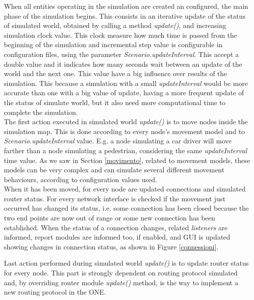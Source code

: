 When all entities operating in the simulation are created an configured, the main phase of the simulation begins. This consists in an iterative update of the status of simulated world, obtained by calling a method \textit{update()}, and increasing simulation clock value. This clock measure how much time is passed from the beginning of the simulation and incremental step value is configurable in configuration files, using the parameter \textit{Scenario.updateInterval}. This accept a double value and it indicates how many seconds wait between an update of the world and the next one. This value have a big influence over results of the simulation. This because a simulation with a small \textit{updateInterval} would be more accurate than one with a big value of update, having a more frequent update of the status of simulate world, but it also need more computational time to complete the simulation.
\\

The first action executed in simulated world \textit{update()} is to move nodes inside the simulation map. This is done according to every node's movement model and to \textit{Scenario.updateInterval} value. E.g. a node simulating a car driver will move farther than a node simulating a pedestrian, considering the same \textit{updateInterval} time value. As we saw in Section \ref{movimento}, related to movement models, these models can be very complex and can simulate several different movement behaviours, according to configuration values used.
\\

When it has been moved, for every node are updated connections and simulated router status. For every network interface is checked if the movement just occurred has changed its status, i.e. some connection has been closed because the two end points are now out of range or some new connection has been established. When the status of a connection changes, related \textit{listeners} are informed, report modules are informed too, if enabled, and GUI is updated showing changes in connection status, as shown in Figure \ref{connessioni}.
\\

Last action performed during simulated world \textit{update()} is to update router status for every node. This part is strongly dependent on routing protocol simulated and, by overriding router module \textit{update()} method, is the way to implement a new routing protocol in the ONE.

